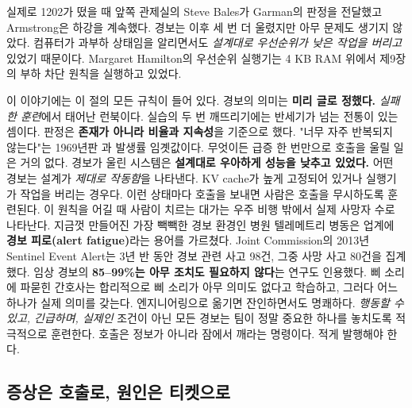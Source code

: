 실제로 1202가 떴을 때 앞쪽 관제실의 Steve Bales가 Garman의 판정을 전달했고 Armstrong은 하강을 계속했다. 경보는 이후 세 번 더 울렸지만 아무 문제도 생기지 않았다. 컴퓨터가 과부하 상태임을 알리면서도 \textit{설계대로 우선순위가 낮은 작업을 버리고} 있었기 때문이다. Margaret Hamilton의 우선순위 실행기는 4 KB RAM 위에서 제9장의 부하 차단 원칙을 실행하고 있었다.

이 이야기에는 이 절의 모든 규칙이 들어 있다. 경보의 의미는 \textbf{미리 글로 정했다.} \textit{실패한 훈련}에서 태어난 런북이다. 실습의 두 번 깨뜨리기에는 반세기가 넘는 전통이 있는 셈이다. 판정은 \textbf{존재가 아니라 비율과 지속성}을 기준으로 했다. "너무 자주 반복되지 않는다"는 1969년판 과 발생률 임곗값이다. 무엇이든 급증 한 번만으로 호출을 울릴 일은 거의 없다. 경보가 울린 시스템은 \textbf{설계대로 우아하게 성능을 낮추고 있었다.} 어떤 경보는 설계가 \textit{제대로 작동함}을 나타낸다. KV cache가 높게 고정되어 있거나 실행기가 작업을 버리는 경우다. 이런 상태마다 호출을 보내면 사람은 호출을 무시하도록 훈련된다. 이 원칙을 어길 때 사람이 치르는 대가는 우주 비행 밖에서 실제 사망자 수로 나타난다. 지금껏 만들어진 가장 빽빽한 경보 환경인 병원 텔레메트리 병동은 업계에 \textbf{경보 피로(alert fatigue)}라는 용어를 가르쳤다. Joint Commission의 2013년 Sentinel Event Alert는 3년 반 동안 경보 관련 사고 98건, 그중 사망 사고 80건을 집계했다. 임상 경보의 \textbf{85–99\%는 아무 조치도 필요하지 않다}는 연구도 인용했다. 삐 소리에 파묻힌 간호사는 합리적으로 삐 소리가 아무 의미도 없다고 학습하고, 그러다 어느 하나가 실제 의미를 갖는다. 엔지니어링으로 옮기면 잔인하면서도 명쾌하다. \textit{행동할 수 있고, 긴급하며, 실제인} 조건이 아닌 모든 경보는 팀이 정말 중요한 하나를 놓치도록 적극적으로 훈련한다. 호출은 정보가 아니라 잠에서 깨라는 명령이다. 적게 발행해야 한다.

\subsection*{증상은 호출로, 원인은 티켓으로}

